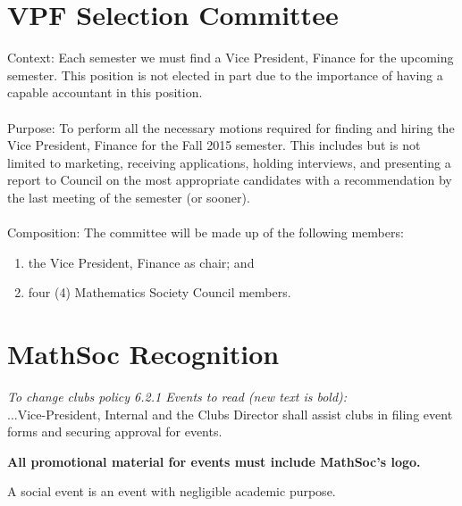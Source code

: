 \documentclass[12pt, letterpaper]{article}
\begin{document}
\newpage
{}
\section*{VPF Selection Committee}
Context: Each semester we must find a Vice President, Finance for the upcoming semester. This position is not elected in part due to the importance of having a capable accountant in this position.  \\\\
Purpose: To perform all the necessary motions required for finding and hiring the Vice President, Finance for the Fall 2015 semester. This includes but is not limited to marketing, receiving applications, holding interviews, and presenting a report to Council on the most appropriate candidates with a recommendation by the last meeting of the semester (or sooner). \\\\
Composition: The committee will be made up of the following members:
\begin{enumerate}
	\item the Vice President, Finance as chair; and
	\item four (4) Mathematics Society Council members.
\end{enumerate}

\newpage
{}
\section*{MathSoc Recognition}
\emph{To change clubs policy 6.2.1 Events to read (new text is bold):}\\

...Vice-President, Internal and the Clubs Director shall assist clubs in filing
event forms and securing approval for events.

\textbf{All promotional material for events must include MathSoc's logo.}

A social event is an event with negligible academic purpose.
\end{document}
